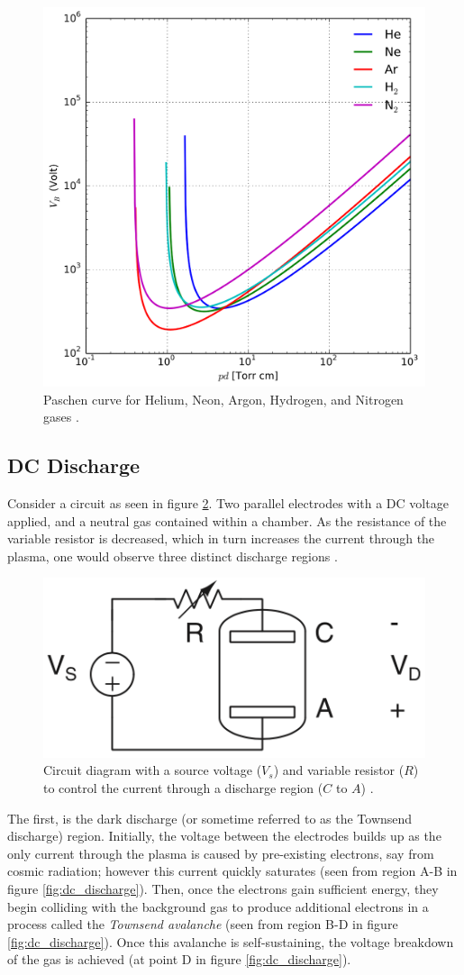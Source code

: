 \begin{figure}[h!]
	\centering
	\includegraphics[width=0.6\linewidth]{chapter_2/figures/paschen_curve.png}
	\caption{Paschen curve for Helium, Neon, Argon, Hydrogen, and Nitrogen gases \cite{Lieberman2005}.}
	\label{fig:pashen_curve}
\end{figure}

\subsection{DC Discharge}

Consider a circuit as seen in figure \ref{fig:basic_circuit}. Two parallel electrodes with a DC voltage applied, and a neutral gas contained within a chamber. As the resistance of the variable resistor is decreased, which in turn increases the current through the plasma, one would observe three distinct discharge regions \cite{Gudmundsson2017}.

\begin{figure}[h!]
	\centering
	\includegraphics[width=0.6\linewidth]{chapter_2/figures/basic_circuit.png}
	\caption{Circuit diagram with a source voltage ($V_s$) and variable resistor ($R$) to control the current through a discharge region ($C$ to $A$) \cite{Gudmundsson2017}.}
	\label{fig:basic_circuit}
\end{figure}

The first, is the dark discharge (or sometime referred to as the Townsend discharge) region. Initially, the voltage between the electrodes builds up as the only current through the plasma is caused by pre-existing electrons, say from cosmic radiation; however this current quickly saturates (seen from region A-B in figure \ref{fig:dc_discharge}). Then, once the electrons gain sufficient energy, they begin colliding with the background gas to produce additional electrons in a process called the \textit{Townsend avalanche} (seen from region B-D in figure \ref{fig:dc_discharge}). Once this avalanche is self-sustaining, the voltage breakdown of the gas is achieved (at point D in figure \ref{fig:dc_discharge}).

